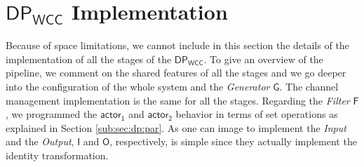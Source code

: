 \documentclass[preprint]{elsarticle}
\newcommand{\dpwcc}{\mathsf{DP_{WCC}}}
\newcommand{\iwcc}{\mathsf{I}}
\newcommand{\owcc}{\mathsf{O}}
\newcommand{\fwcc}{\mathsf{F}}
\newcommand{\gwcc}{\mathsf{G}}
\newcommand{\Act}{\mathsf{actor_1}}
\newcommand{\Actt}{\mathsf{actor_2}}
\begin{document}

\section{$\dpwcc$ Implementation}

Because of space limitations, we cannot include in this section the details of the implementation of all the stages of the $\dpwcc$. To give an overview of the pipeline,  we comment on the shared features of all the stages and we go deeper into the configuration of the whole system and the \textit{Generator} $\gwcc$. The channel management implementation is the same for all the stages. Regarding the \textit{Filter} $\fwcc$, we programmed the $\Act$ and $\Actt$ behavior in terms of set operations as explained in Section \ref{sub:sec:dp:par}. As one can image to implement the  \textit{Input} and the  \textit{Output}, $\iwcc$ and $\owcc$, respectively, is simple since they actually implement the identity transformation.
\end{document}
